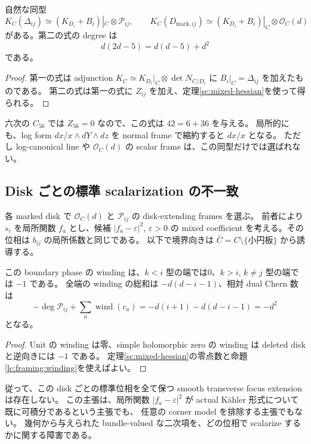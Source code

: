 \begin{proposition}\label{sc:log-adjunction}
自然な同型
\[
 K_C(\Delta_{ij})\simeq (K_{D_i}+B_i)|_C\otimes\mathcal P_{ij},\qquad
 K_C(D_{\mathrm{mark},ij})\simeq (K_{D_i}+B_i)|_C\otimes\mathcal O_C(d)
\]
がある。第二の式の degree は
\[
 d(2d-5)=d(d-5)+d^2
\]
である。
\end{proposition}

\begin{proof}
第一の式は adjunction $K_C\simeq K_{D_i}|_C\otimes\det N_{C/D_i}$ に
$B_i|_C=\Delta_{ij}$ を加えたものである。
第二の式は第一の式に $Z_{ij}$ を加え、定理\ref{sc:mixed-hessian}を使って得られる。
\end{proof}

六次の $C_{56}$ では $Z_{56}=0$ なので、この式は $42=6+36$ を与える。
局所的にも、log form $dx/x\wedge dY\wedge dz$ を normal frame で縮約すると $dx/x$ となる。
ただし log-canonical line や $\mathcal O_C(d)$ の scalar frame は、この同型だけでは選ばれない。

\subsection{Disk ごとの標準 scalarization の不一致}

各 marked disk で $\mathcal O_C(d)$ と $\mathcal P_{ij}$ の disk-extending frames を選ぶ。
前者により $s_i$ を局所関数 $f_a$ とし、候補 $|f_a-\varepsilon|^2$, $\varepsilon>0$ の
mixed coefficient を考える。その位相は $b_{ij}$ の局所係数と同じである。
以下で境界向きは $\bar C=C\setminus\{\text{小円板}\}$ から誘導する。

\begin{corollary}\label{sc:universal-defect}
この boundary phase の winding は、$k<i$ 型の端では0、$k>i$, $k\ne j$ 型の端では $-1$ である。
全端の winding の総和は $-d(d-i-1)$、相対 dual Chern 数は
\begin{equation}\label{sc:universal-defect-value}
 -\deg\mathcal P_{ij}+\sum_a\operatorname{wind}(c_a)
 =-d(i+1)-d(d-i-1)=-d^2
\end{equation}
となる。
\end{corollary}

\begin{proof}
Unit の winding は零、simple holomorphic zero の winding は deleted disk と逆向きには $-1$ である。
定理\ref{sc:mixed-hessian}の零点数と命題\ref{lc:framing:winding}を使えばよい。
\end{proof}

従って、この disk ごとの標準位相を全て保つ smooth transverse focus extension は存在しない。
この主張は、局所関数 $|f_a-\varepsilon|^2$ が actual Kähler 形式について既に可積分であるという主張でも、
任意の corner model を排除する主張でもない。
幾何から与えられた bundle-valued な二次項を、どの位相で scalarize するかに関する障害である。

